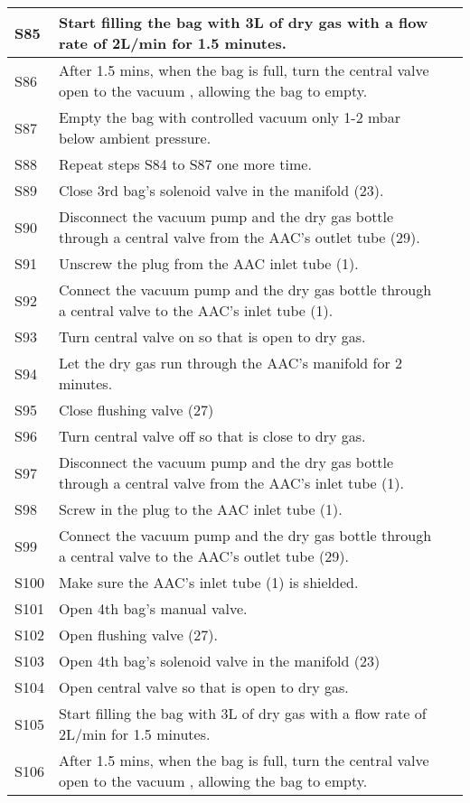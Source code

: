 \begin{longtable} {|m{}|m{}|m{}|}
S85 & Start filling the bag with 3L of dry gas with a flow rate of 2L/min for 1.5 minutes. & \\ \hline
S86 & After 1.5 mins, when the bag is full, turn the central valve open to the vacuum , allowing the bag to empty. & \\ \hline
S87 & Empty the bag with controlled vacuum only 1-2 mbar below ambient pressure. & \\ \hline
S88 & Repeat steps S84 to S87 one more time. & \\ \hline
S89 & Close 3rd bag's solenoid valve in the manifold (23). & \\ \hline
S90 & Disconnect the vacuum pump and the dry gas bottle through a central valve from the AAC's outlet tube (29). & \\ \hline
S91 & Unscrew the plug from the AAC inlet tube (1). & \\ \hline
S92 & Connect the vacuum pump and the dry gas bottle through a central valve to the AAC's inlet tube (1). & \\ \hline
S93 & Turn central valve on so that is open to dry gas. & \\ \hline
S94 & Let the dry gas run through the AAC's manifold for 2 minutes. & \\ \hline
S95 & Close flushing valve (27) & \\ \hline
S96 & Turn central valve off so that is close to dry gas. & \\ \hline
S97 & Disconnect the vacuum pump and the dry gas bottle through a central valve from the AAC's inlet tube (1). & \\ \hline
S98 & Screw in the plug to the AAC inlet tube (1). & \\ \hline
S99 & Connect the vacuum pump and the dry gas bottle through a central valve to the AAC's outlet tube (29). & \\ \hline
S100 & Make sure the AAC's inlet tube (1) is shielded. & \\ \hline
S101 & Open 4th bag's manual valve. & \\ \hline
S102 & Open flushing valve (27). & \\ \hline
S103 & Open 4th bag's solenoid valve in the manifold (23) & \\ \hline
S104 & Open central valve so that is open to dry gas. & \\ \hline
S105 & Start filling the bag with 3L of dry gas with a flow rate of 2L/min for 1.5 minutes. & \\ \hline
S106 & After 1.5 mins, when the bag is full, turn the central valve open to the vacuum , allowing the bag to empty. & \\ \hline

\end{longtable}
